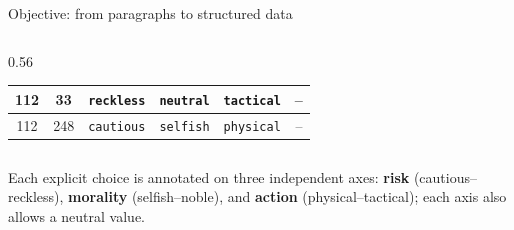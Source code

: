 \documentclass{beamer}
\newcommand{\imp}[1]{\textbf{\color{cyan}#1}}
\begin{document}
\begin{frame}{Objective: from paragraphs to structured data}
\begin{columns}[T,onlytextwidth]
\begin{column}[T]{0.56\textwidth}
{{\begin{tabular}{|c|c|c|c|c|c|}
  							112 &
  							33 &
  							\texttt{reckless} &
  							\texttt{neutral} &
  							\texttt{tactical} &
  							-- \\
  							
  							\hline
  							
  							112 &
  							248 &
  							\texttt{cautious} &
  							\texttt{selfish} &
  							\texttt{physical} &
  							-- \\
  							
  							\hline
  						\end{tabular}%
  				}}
  				
  				\vspace{0.1cm}
  				
  			\end{column}
  			
  		\end{columns}
  		
  		\vspace{0.2cm}
  		{\footnotesize
  			Each explicit choice is annotated on three independent axes:
  			\imp{risk} (cautious--reckless),
  			\imp{morality} (selfish--noble), and
  			\imp{action} (physical--tactical); each axis also allows a neutral value.
  		}
  		
  		
  	\end{frame}
	
	
\end{document}
